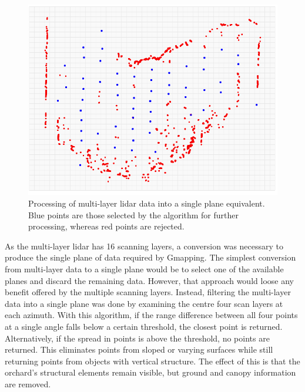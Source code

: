 \documentclass[preprint,authoryear,12pt]{elsarticle}
\begin{document}
        \begin{figure}[htb]
            \centering
            \includegraphics[width=\linewidth]{imgs/single_plane_extraction/single_plane_extraction.pdf}
            \caption{
                Processing of multi-layer lidar data into a single plane equivalent.
                Blue points are those selected by the algorithm for further processing, whereas red points are rejected.
            }
            \label{fig:singlePlaneExtraction}
        \end{figure}

        As the multi-layer lidar has 16 scanning layers, a conversion was necessary to produce the single plane of data required by Gmapping.
        The simplest conversion from multi-layer data to a single plane would be to select one of the available planes and discard the remaining data.
        However, that approach would loose any benefit offered by the multiple scanning layers.
        Instead, filtering the multi-layer data into a single plane was done by examining the centre four scan layers at each azimuth.
        With this algorithm, if the range difference between all four points at a single angle falls below a certain threshold, the closest point is returned.
        Alternatively, if the spread in points is above the threshold, no points are returned.
        This eliminates points from sloped or varying surfaces while still returning points from objects with vertical structure.
        The effect of this is that the orchard's structural elements remain visible, but ground and canopy information are removed.
\end{document}
